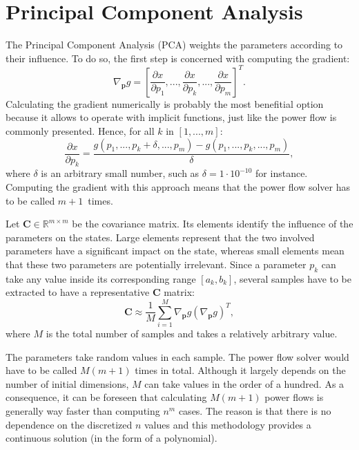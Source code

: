 \section{Principal Component Analysis}
The Principal Component Analysis (PCA) weights the parameters according to their influence. To do so, the first step is concerned with computing the gradient:
\begin{equation}
  \nabla_{\mathbf{p}}g = \left[\frac{\partial x}{\partial p_1}, ..., \frac{\partial x}{\partial p_k}, ..., \frac{\partial x}{\partial p_m} \right]^T.
  \label{eq:grad1}
\end{equation}
Calculating the gradient numerically is probably the most benefitial option because it allows to operate with implicit functions, just like the power flow is commonly presented. Hence, for all $k$ in $[1,...,m]$:
\begin{equation}
  \frac{\partial x}{\partial p_k} = \frac{g(p_1,...,p_k + \delta,...,p_m) - g(p_1,...,p_k,...,p_m)}{\delta},
  \label{eq:grad2}
\end{equation}
where $\delta$ is an arbitrary small number, such as $\delta=1\cdot 10^{-10}$ for instance. Computing the gradient with this approach means that the power flow solver has to be called $m+1$~times. 

Let $\mathbf{C}\in \mathbb{R}^{m \times m}$ be the covariance matrix. Its elements identify the influence of the parameters on the states. Large elements represent that the two involved parameters have a significant impact on the state, whereas small elements mean that these two parameters are potentially irrelevant. Since a parameter $p_k$ can take any value inside its corresponding range $[a_k,b_k]$, several samples have to be extracted to have a representative $\mathbf{C}$ matrix:
\begin{equation}
  \mathbf{C} \approx \frac{1}{M} \sum_{i=1}^M \nabla_{\mathbf{p}}g (\nabla_{\mathbf{p}}g)^T,
  \label{eq:C1}
\end{equation}
where $M$ is the total number of samples and takes a relatively arbitrary value. 

The parameters take random values in each sample. The power flow solver would have to be called $M(m+1)$ times in total. Although it largely depends on the number of initial dimensions, $M$ can take values in the order of a hundred. As a consequence, it can be foreseen that calculating $M(m+1)$ power flows is generally way faster than computing $n^m$ cases. The reason is that there is no dependence on the discretized $n$ values and this methodology provides a continuous solution (in the form of a polynomial). 

